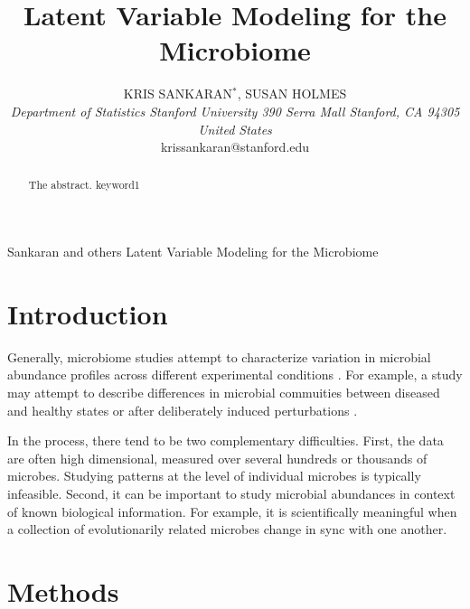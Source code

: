\documentclass[oupdraft]{bio}
\begin{document}
\title{Latent Variable Modeling for the Microbiome} 

\author{
  KRIS SANKARAN$^\ast$, SUSAN HOLMES\\[4pt]
  \textit{
    Department of Statistics
    Stanford University
    390 Serra Mall
    Stanford, CA 94305
    United States
  } \\[2pt]
  {krissankaran@stanford.edu}
}

\markboth
{Sankaran and others}
{Latent Variable Modeling for the Microbiome}

\maketitle


\begin{abstract}
  {
    The abstract.
  }
  {
    keyword1
  }
\end{abstract}

\section{Introduction}

Generally, microbiome studies attempt to characterize variation in microbial
abundance profiles across different experimental conditions
\cite{human2012structure}. For example, a study may attempt to describe differences
in microbial commuities between diseased and healthy states or after
deliberately induced perturbations \cite{dethlefsen2011incomplete}.

In the process, there tend to be two complementary difficulties. First, the data
are often high dimensional, measured over several hundreds or thousands of
microbes. Studying patterns at the level of individual microbes is typically
infeasible. Second, it can be important to study microbial abundances in context
of known biological information. For example, it is scientifically meaningful
when a collection of evolutionarily related microbes change in sync with one
another.


\section{Methods}
\end{document}

